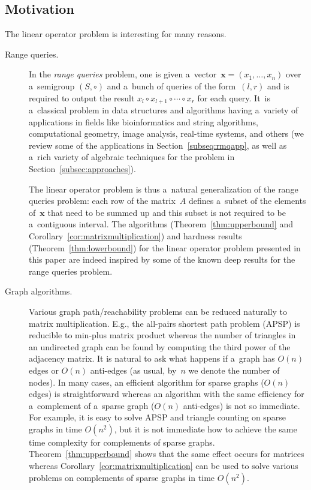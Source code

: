 \documentclass[11pt,letterpaper]{article}
\begin{document}
\subsection{Motivation}
The linear operator problem is interesting for many reasons.
\begin{description}
\item[Range queries.] In the \emph{range queries} problem, 
one is given a~vector~$\mathbf{x}=(x_1, \dotsc, x_n)$ over 
a~semigroup $(S, \circ)$ and 
a~bunch of queries of the form~$(l,r)$ and is required to 
output the result $x_l \circ x_{l+1} \circ \dotsb \circ x_r$ 
for each query. It~is a~classical problem in data structures and 
algorithms
having a~variety of applications in fields like bioinformatics and 
string
algorithms, computational geometry, image analysis, real-time 
systems, and
others (we review some of the applications in 
Section~\ref{subseq:rmqapp}, as
well as a~rich variety of algebraic techniques for the problem in
Section~\ref{subsec:approaches}).


The linear operator problem is thus a~natural
generalization of the range queries problem: each row of the
matrix~$A$ defines a~subset of the elements of~$\mathbf{x}$
that need to be summed up and this subset is not required to be 
a~contiguous interval. The algorithms (Theorem~\ref{thm:upperbound} and Corollary~\ref{cor:matrixmultiplication}) and hardness results (Theorem~\ref{thm:lowerbound}) for 
the linear operator problem presented in this paper 
are indeed inspired 
by some of the known deep results for the range queries problem.

\item[Graph algorithms.] Various graph path/reachability 
problems can be reduced naturally to matrix multiplication. 
E.g., the all-pairs shortest path problem (APSP) is reducible
to min-plus matrix product whereas
the number of triangles in an undirected graph 
can be found by computing the third power of the
adjacency matrix.
It is natural to ask what happens if
a~graph has $O(n)$ edges or $O(n)$ anti-edges 
(as usual, by~$n$ we denote the number of nodes). 
In many cases, an efficient algorithm 
for sparse graphs ($O(n)$ edges) is 
straightforward
whereas an algorithm with the same efficiency
for 
a~complement of a~sparse graph ($O(n)$ anti-edges) is not so immediate. For
example, it is easy to solve APSP and triangle counting on sparse graphs in time $O(n^2)$, but it is not immediate how to achieve
the same time complexity for complements of sparse graphs.
Theorem~\ref{thm:upperbound} shows that the same effect 
occurs for matrices whereas 
Corollary~\ref{cor:matrixmultiplication} can be used to
solve various problems on complements of 
sparse graphs in time $O(n^2)$.


\end{description}
\end{document}
